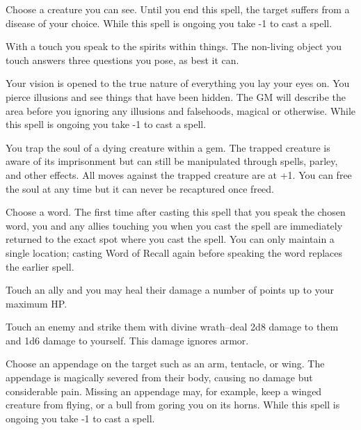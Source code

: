  Choose a creature you can see. Until you end this spell, the target suffers from a disease of your choice. While this spell is ongoing you take -1 to cast a spell.




 With a touch you speak to the spirits within things. The non-living object you touch answers three questions you pose, as best it can.





 Your vision is opened to the true nature of everything you lay your eyes on. You pierce illusions and see things that have been hidden. The GM will describe the area before you ignoring any illusions and falsehoods, magical or otherwise. While this spell is ongoing you take -1 to cast a spell.




 You trap the soul of a dying creature within a gem. The trapped creature is aware of its imprisonment but can still be manipulated through spells, parley, and other effects. All moves against the trapped creature are at +1. You can free the soul at any time but it can never be recaptured once freed.




 Choose a word. The first time after casting this spell that you speak the chosen word, you and any allies touching you when you cast the spell are immediately returned to the exact spot where you cast the spell. You can only maintain a single location; casting Word of Recall again before speaking the word replaces the earlier spell.




 Touch an ally and you may heal their damage a number of points up to your maximum HP.




 Touch an enemy and strike them with divine wrath--deal 2d8 damage to them and 1d6 damage to yourself. This damage ignores armor.





 Choose an appendage on the target such as an arm, tentacle, or wing. The appendage is magically severed from their body, causing no damage but considerable pain. Missing an appendage may, for example, keep a winged creature from flying, or a bull from goring you on its horns. While this spell is ongoing you take -1 to cast a spell.


